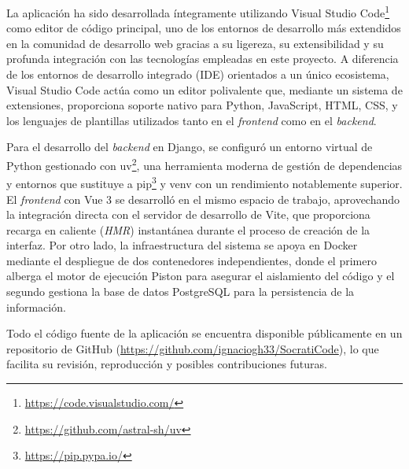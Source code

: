 La aplicación ha sido desarrollada íntegramente utilizando Visual Studio Code\footnote{\url{https://code.visualstudio.com/}} como editor de código principal, uno de los entornos de desarrollo más extendidos en la comunidad de desarrollo web gracias a su ligereza, su extensibilidad y su profunda integración con las tecnologías empleadas en este proyecto. A diferencia de los entornos de desarrollo integrado (IDE) orientados a un único ecosistema, Visual Studio Code actúa como un editor polivalente que, mediante un sistema de extensiones, proporciona soporte nativo para Python, JavaScript, HTML, CSS, y los lenguajes de plantillas utilizados tanto en el \textit{frontend} como en el \textit{backend}.

Para el desarrollo del \textit{backend} en Django, se configuró un entorno virtual de Python gestionado con uv\footnote{\url{https://github.com/astral-sh/uv}}, una herramienta moderna de gestión de dependencias y entornos que sustituye a pip\footnote{\url{https://pip.pypa.io/}} y venv con un rendimiento notablemente superior. El \textit{frontend} con Vue 3 se desarrolló en el mismo espacio de trabajo, aprovechando la integración directa con el servidor de desarrollo de Vite, que proporciona recarga en caliente (\textit{HMR}) instantánea durante el proceso de creación de la interfaz. Por otro lado, la infraestructura del sistema se apoya en Docker mediante el despliegue de dos contenedores independientes, donde el primero alberga el motor de ejecución Piston para asegurar el aislamiento del código y el segundo gestiona la base de datos PostgreSQL para la persistencia de la información.

Todo el código fuente de la aplicación se encuentra disponible públicamente en un repositorio de GitHub (\url{https://github.com/ignaciogh33/SocratiCode}), lo que facilita su revisión, reproducción y posibles contribuciones futuras.
